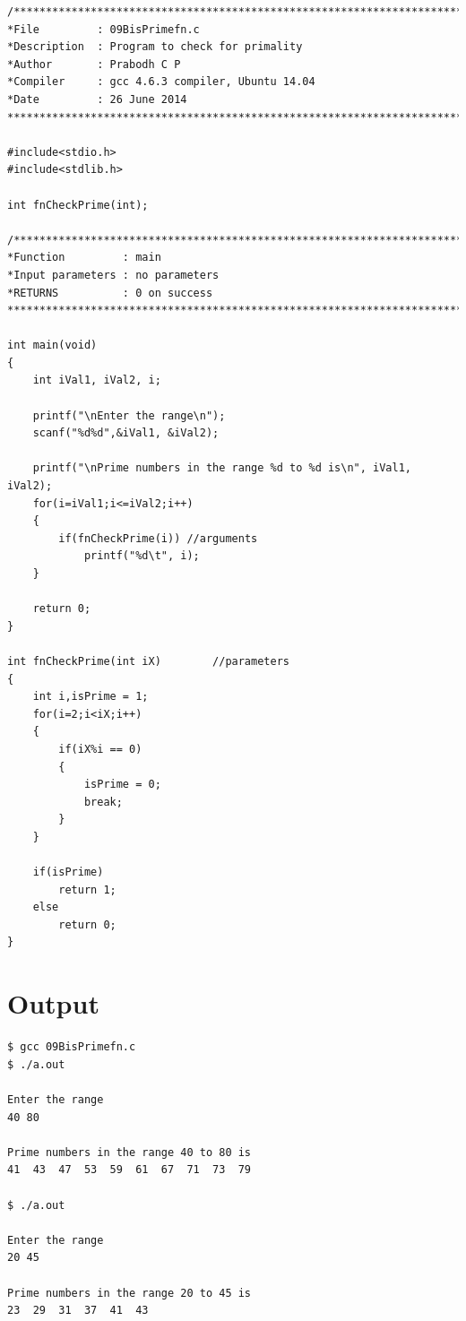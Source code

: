 \documentclass[a4paper]{report}
\begin{document}
\begin{Verbatim}
/***************************************************************************
*File         : 09BisPrimefn.c
*Description  : Program to check for primality
*Author       : Prabodh C P
*Compiler     : gcc 4.6.3 compiler, Ubuntu 14.04
*Date         : 26 June 2014
***************************************************************************/

#include<stdio.h>
#include<stdlib.h>

int fnCheckPrime(int);

/***************************************************************************
*Function         :	main
*Input parameters :	no parameters
*RETURNS          :	0 on success
***************************************************************************/

int main(void)
{
	int iVal1, iVal2, i;

	printf("\nEnter the range\n");
	scanf("%d%d",&iVal1, &iVal2);

	printf("\nPrime numbers in the range %d to %d is\n", iVal1, iVal2);
	for(i=iVal1;i<=iVal2;i++)
	{
        if(fnCheckPrime(i))	//arguments
            printf("%d\t", i);
	}

	return 0;
}

int fnCheckPrime(int iX)		//parameters
{
	int i,isPrime = 1;
	for(i=2;i<iX;i++)
	{
		if(iX%i == 0)
		{
			isPrime = 0;
			break;
		}
	}

	if(isPrime)
        return 1;
	else
        return 0;
}
\end{Verbatim}

\pagebreak
\section*{Output}
\begin{Verbatim}
$ gcc 09BisPrimefn.c 
$ ./a.out 

Enter the range
40 80

Prime numbers in the range 40 to 80 is
41	43	47	53	59	61	67	71	73	79	

$ ./a.out 

Enter the range
20 45

Prime numbers in the range 20 to 45 is
23	29	31	37	41	43	
\end{Verbatim}
\end{document}
